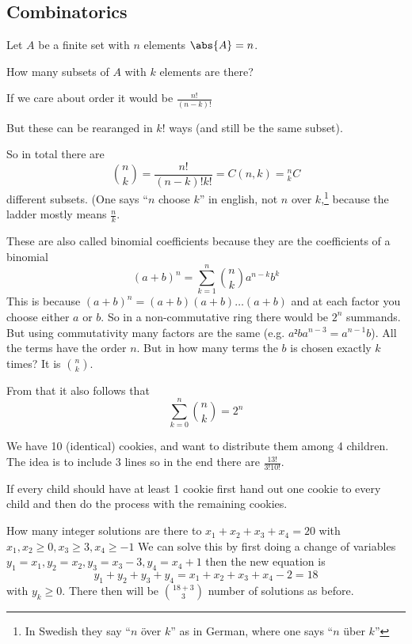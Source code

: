 \documentclass[english]{lbscript}
\begin{document}
\subsection{Combinatorics}
\label{sec:combinatorics}

Let \(A\) be a finite set with \(n\) elements \(\abs{A}=n\).

How many subsets of \(A\) with \(k\) elements are there?

If we care about order it would be \(\frac{n!}{(n-k)!}\)

But these can be rearanged in \(k!\) ways (and still be the same subset).

So in total there are
\begin{equation}
\label{eq:1}
\binom{n}{k} = \frac{n!}{(n-k)!k!} = C(n, k) = {}^{n}_{k}C
\end{equation}
different subsets. (One says \enquote{\(n\) choose \(k\)} in english, not \(n\) over \(k\),\footnote{In Swedish they say \enquote{\(n\) över \(k\)} as in German, where one says \enquote{\(n\) über \(k\)}} because the ladder mostly means \(\frac{n}{k}\).

These are also called binomial coefficients because they are the coefficients of a binomial
\begin{equation}
\label{eq:2}
(a+b)^{n} = ∑_{k=1}^{n} \binom{n}{k} a^{n-k} b^{k}
\end{equation}
This is because \((a+b)^{n}=(a+b)(a+b)\dots(a+b)\) and at each factor you choose either \(a\) or \(b\). So in a non-commutative ring there would be \(2^{n}\) summands. But using commutativity many factors are the same (e.g. \(a²ba^{n-3}=a^{n-1}b\)). All the terms have the order \(n\). But in how many terms the \(b\) is chosen exactly \(k\) times? It is \(\binom{n}{k}\).

From that it also follows that
\begin{equation}
\label{eq:3}
∑_{k=0}^{n} \binom{n}{k} = 2^{n}
\end{equation}

\begin{example}{We have 10 (identical) cookies, and want to distribute them among 4 children.}{}
  The idea is to include 3 lines so in the end there are \(\frac{13!}{3!10!}\).

  If every child should have at least 1 cookie first hand out one cookie to every child and then do the process with the remaining cookies.
\end{example}

\begin{example}{How many integer solutions are there to \(x_1+x_2+ x_3+x_4=20\) with \(x_1,x_2≥0, x_3≥3, x_4≥-1\)}{}
  We can solve this by first doing a change of variables \(y_1=x_1, y_2=x_2, y_3=x_3-3, y_4=x_4+1\) then the new equation is
\begin{equation}
\label{eq:4}
y_1+y_2+y_3+y_4=x_1+x_2+x_3+x_4-2 = 18
\end{equation}
with \(y_k≥0\). There then will be \(\binom{18+3}{3}\) number of solutions as before.
\end{example}
\end{document}
